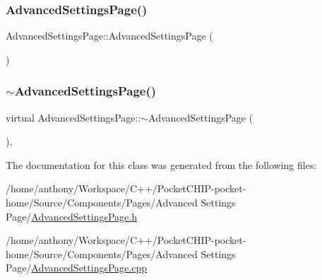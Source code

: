 \subsubsection{\texorpdfstring{Advanced\+Settings\+Page()}{AdvancedSettingsPage()}}
{\footnotesize\ttfamily Advanced\+Settings\+Page\+::\+Advanced\+Settings\+Page (\begin{DoxyParamCaption}{ }\end{DoxyParamCaption})}

\mbox{\label{classAdvancedSettingsPage_a8252f2774ca5fc6fd59c73e8ac1ff761}} 
\subsubsection{\texorpdfstring{$\sim$\+Advanced\+Settings\+Page()}{~AdvancedSettingsPage()}}
{\footnotesize\ttfamily virtual Advanced\+Settings\+Page\+::$\sim$\+Advanced\+Settings\+Page (\begin{DoxyParamCaption}{ }\end{DoxyParamCaption})\hspace{0.3cm}{\ttfamily [inline]}, {\ttfamily [virtual]}}



The documentation for this class was generated from the following files\+:\begin{DoxyCompactItemize}
\item 
/home/anthony/\+Workspace/\+C++/\+Pocket\+C\+H\+I\+P-\/pocket-\/home/\+Source/\+Components/\+Pages/\+Advanced Settings Page/\mbox{\hyperlink{AdvancedSettingsPage_8h}{Advanced\+Settings\+Page.\+h}}\item 
/home/anthony/\+Workspace/\+C++/\+Pocket\+C\+H\+I\+P-\/pocket-\/home/\+Source/\+Components/\+Pages/\+Advanced Settings Page/\mbox{\hyperlink{AdvancedSettingsPage_8cpp}{Advanced\+Settings\+Page.\+cpp}}\end{DoxyCompactItemize}

